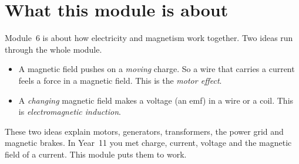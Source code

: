 %
\makecover
{}
\begingroup
  \contentsmargin[0.65em]{1.9em}%
  \tableofcontents
\endgroup


\newcommand\ovYes{\textcolor{hscformula}{\faCheck}}
\newcommand\ovNo{\textcolor{hscmistake}{\faTimes}}
\newcommand\ovComb{\textcolor{hsctiptext}{\faLink}}
\newcommand\ovrow[3]{#1 & #2 & {\footnotesize #3}\\\hline}
\newcommand\ovch[2]{\multicolumn{3}{@{}l@{}}{\rule{0pt}{3.4ex}\cref{#1}:
  {\bfseries\color{hscbrand}#2}}\\\hline}
\newenvironment{ovgrid}{%
  \small\renewcommand\arraystretch{1.32}\arrayrulecolor{hscrule}%
  \begin{tabular}[t]{@{}C{4.5mm}@{\hspace{1.5mm}}L{40mm}@{\hspace{1.5mm}}L{\dimexpr\linewidth-47.5mm\relax}@{}}}%
  {\end{tabular}}

\section*{What this module is about}

Module~6 is about how electricity and magnetism work together. Two ideas run through the
whole module.
\begin{itemize}
  \item A magnetic field pushes on a \emph{moving} charge. So a wire that carries a current
        feels a force in a magnetic field. This is the \emph{motor effect}.
  \item A \emph{changing} magnetic field makes a voltage (an emf) in a wire or a coil. This
        is \emph{electromagnetic induction}.
\end{itemize}
These two ideas explain motors, generators, transformers, the power grid and magnetic
brakes. In Year~11 you met charge, current, voltage and the magnetic field of a current.
This module puts them to work.

